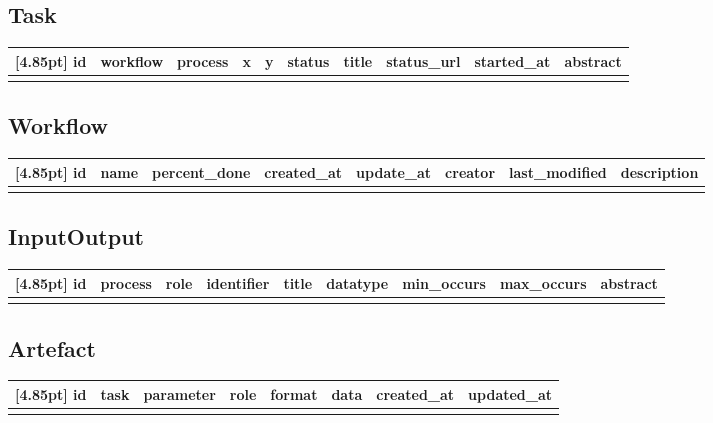 		\subsection{Task}
		\begin{center}
			\setlength\tabcolsep{5pt}
			\renewcommand{\arraystretch}{1.5}
			\setcounter{ids}{0}			
			\begin{tabular}{|c|c|c|c|c|c|c|c|c|c|}
				\hline
				\rowcolor[gray]{0.75}[4.85pt]
				id & workflow & process & x & y & status & title & status\_url & started\_at & abstract \\ \hline  
				&&&&&&&&& \\
				\hline
			\end{tabular}
		\end{center} 
		
		
		\subsection{Workflow}
		\begin{center}
			\setlength\tabcolsep{5pt}
			\renewcommand{\arraystretch}{1.5}
			\setcounter{ids}{0}			
			\begin{tabular}{|c|c|c|c|c|c|c|c|}
				\hline
				\rowcolor[gray]{0.75}[4.85pt]
				id & name & percent\_done & created\_at & update\_at & creator & last\_modified & description \\ \hline 
				&&&&&&& \\
				\hline
			\end{tabular}
		\end{center}
		
		
		
		\subsection{InputOutput}
		\begin{center}
			\setlength\tabcolsep{5pt}
			\renewcommand{\arraystretch}{1.5}
			\setcounter{ids}{0}			
			\begin{tabular}{|c|c|c|c|c|c|c|c|c|}
				\hline
				\rowcolor[gray]{0.75}[4.85pt]
				id & process & role & identifier & title & datatype & min\_occurs & max\_occurs & abstract \\ \hline 
				&&&&&&&& \\
				\hline
			\end{tabular}
		\end{center}
		
		
		\subsection{Artefact}
		\begin{center}
			\setlength\tabcolsep{5pt}
			\renewcommand{\arraystretch}{1.5}
			\setcounter{ids}{0}			
			\begin{tabular}{|c|c|c|c|c|c|c|c|}
				\hline
				\rowcolor[gray]{0.75}[4.85pt]
				id & task & parameter & role & format & data & created\_at & updated\_at \\ \hline 
				&&&&&&& \\
				\hline
			\end{tabular}
		\end{center}		
		
